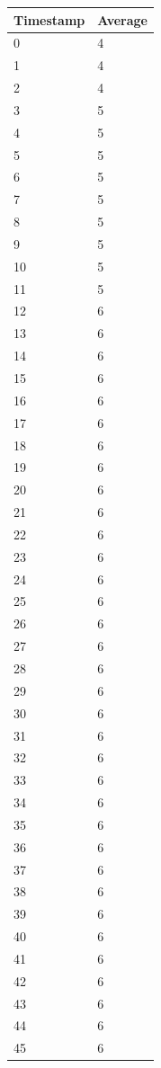 %
%
\begin{tabular}{|l||l|}
\hline
	\textbf{Timestamp} & \textbf{Average} \\ \hline
	0 & 4 \\ \hline
	1 & 4 \\ \hline
	2 & 4 \\ \hline
	3 & 5 \\ \hline
	4 & 5 \\ \hline
	5 & 5 \\ \hline
	6 & 5 \\ \hline
	7 & 5 \\ \hline
	8 & 5 \\ \hline
	9 & 5 \\ \hline
	10 & 5 \\ \hline
	11 & 5 \\ \hline
	12 & 6 \\ \hline
	13 & 6 \\ \hline
	14 & 6 \\ \hline
	15 & 6 \\ \hline
	16 & 6 \\ \hline
	17 & 6 \\ \hline
	18 & 6 \\ \hline
	19 & 6 \\ \hline
	20 & 6 \\ \hline
	21 & 6 \\ \hline
	22 & 6 \\ \hline
	23 & 6 \\ \hline
	24 & 6 \\ \hline
	25 & 6 \\ \hline
	26 & 6 \\ \hline
	27 & 6 \\ \hline
	28 & 6 \\ \hline
	29 & 6 \\ \hline
	30 & 6 \\ \hline
	31 & 6 \\ \hline
	32 & 6 \\ \hline
	33 & 6 \\ \hline
	34 & 6 \\ \hline
	35 & 6 \\ \hline
	36 & 6 \\ \hline
	37 & 6 \\ \hline
	38 & 6 \\ \hline
	39 & 6 \\ \hline
	40 & 6 \\ \hline
	41 & 6 \\ \hline
	42 & 6 \\ \hline
	43 & 6 \\ \hline
	44 & 6 \\ \hline
	45 & 6 \\ \hline
\end{tabular}

